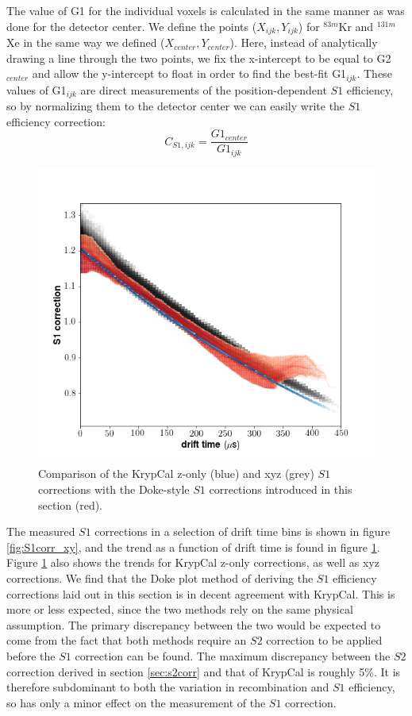 {The value of G1 for the individual voxels is calculated in the same manner as was done for the detector center. We define the points ($X_{ijk},Y_{ijk}$) for $^{83m}$Kr and $^{131m}$Xe in the same way we defined ($X_{center},Y_{center}$). Here, instead of analytically drawing a line through the two points, we fix the x-intercept to be equal to G2$_{center}$ and allow the y-intercept to float in order to find the best-fit G1$_{ijk}$. These values of G1$_{ijk}$ are direct measurements of the position-dependent $S1$ efficiency, so by normalizing them to the detector center we can easily write the $S1$ efficiency correction:
\begin{equation}
C_{S1,ijk}=\frac{G1_{center}}{G1_{ijk}}
\end{equation}
\begin{figure}[h!]
\centering
\includegraphics[width=150mm]{Figures/S1corr_dt.png}
\caption{Comparison of the KrypCal z-only (blue) and xyz (grey) $S1$ corrections with the Doke-style $S1$ corrections introduced in this section (red). }
\label{fig:S1corr_dt} 
\end{figure}

The measured $S1$ corrections in a selection of drift time bins is shown in figure \ref{fig:S1corr_xy}, and the trend as a function of drift time is found in figure \ref{fig:S1corr_dt}. Figure \ref{fig:S1corr_dt} also shows the trends for KrypCal z-only corrections, as well as xyz corrections. We find that the Doke plot method of deriving the $S1$ efficiency corrections laid out in this section is in decent agreement with KrypCal. This is more or less expected, since the two methods rely on the same physical assumption. The primary discrepancy between the two would be expected to come from the fact that both methods require an $S2$ correction to be applied before the $S1$ correction can be found. The maximum discrepancy between the $S2$ correction derived in section \ref{sec:s2corr} and that of KrypCal is roughly 5\%. It is therefore subdominant to both the variation in recombination and $S1$ efficiency, so has only a minor effect on the measurement of the $S1$ correction.  

}
